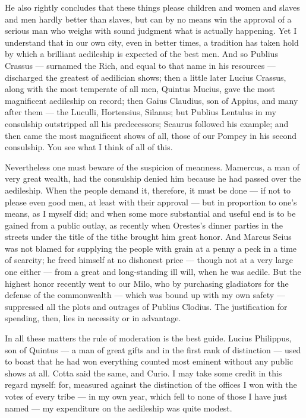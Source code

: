  He also rightly concludes that these things please children and women and slaves and men hardly better than slaves, but can by no means win the approval of a serious man who weighs with sound judgment what is actually happening. Yet I understand that in our own city, even in better times, a tradition has taken hold by which a brilliant aedileship is expected of the best men. And so Publius Crassus — surnamed the Rich, and equal to that name in his resources — discharged the greatest of aedilician shows; then a little later Lucius Crassus, along with the most temperate of all men, Quintus Mucius, gave the most magnificent aedileship on record; then Gaius Claudius, son of Appius, and many after them — the Luculli, Hortensius, Silanus; but Publius Lentulus in my consulship outstripped all his predecessors; Scaurus followed his example; and then came the most magnificent shows of all, those of our Pompey in his second consulship. You see what I think of all of this.

 Nevertheless one must beware of the suspicion of meanness. Mamercus, a man of very great wealth, had the consulship denied him because he had passed over the aedileship. When the people demand it, therefore, it must be done — if not to please even good men, at least with their approval — but in proportion to one's means, as I myself did; and when some more substantial and useful end is to be gained from a public outlay, as recently when Orestes's dinner parties in the streets under the title of the tithe brought him great honor. And Marcus Seius was not blamed for supplying the people with grain at a penny a peck in a time of scarcity; he freed himself at no dishonest price — though not at a very large one either — from a great and long-standing ill will, when he was aedile. But the highest honor recently went to our Milo, who by purchasing gladiators for the defense of the commonwealth — which was bound up with my own safety — suppressed all the plots and outrages of Publius Clodius. The justification for spending, then, lies in necessity or in advantage.

 In all these matters the rule of moderation is the best guide. Lucius Philippus, son of Quintus — a man of great gifts and in the first rank of distinction — used to boast that he had won everything counted most eminent without any public shows at all. Cotta said the same, and Curio. I may take some credit in this regard myself: for, measured against the distinction of the offices I won with the votes of every tribe — in my own year, which fell to none of those I have just named — my expenditure on the aedileship was quite modest.

